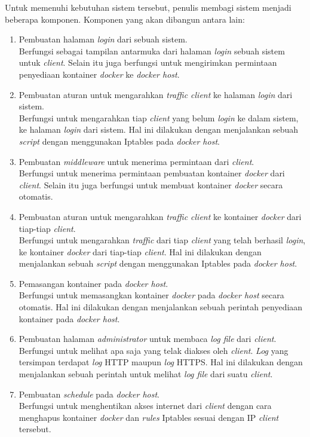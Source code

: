 \indent Untuk memenuhi kebutuhan sistem tersebut, penulis membagi sistem menjadi beberapa komponen. Komponen yang akan dibangun antara lain: 
\begin{enumerate} 
	\item Pembuatan halaman \textit{login} dari sebuah sistem.\\
	Berfungsi sebagai tampilan antarmuka dari halaman \textit{login} sebuah sistem untuk \textit{client}. Selain itu juga berfungsi untuk mengirimkan permintaan penyediaan kontainer \textit{docker} ke \textit{docker host}.
	\item Pembuatan aturan untuk mengarahkan \textit{traffic client} ke halaman \textit{login} dari sistem.\\
	Berfungsi untuk mengarahkan tiap \textit{client} yang belum \textit{login} ke dalam sistem, ke halaman \textit{login} dari sistem. Hal ini dilakukan dengan menjalankan sebuah \textit{script} dengan menggunakan Iptables pada \textit{docker host}.
	\item Pembuatan \textit{middleware} untuk menerima permintaan dari \textit{client}.\\
	Berfungsi untuk menerima permintaan pembuatan kontainer \textit{docker} dari \textit{client}. Selain itu juga berfungsi untuk membuat kontainer \textit{docker} secara otomatis.
	\item Pembuatan aturan untuk mengarahkan \textit{traffic client} ke kontainer \textit{docker} dari tiap-tiap \textit{client}.\\
	Berfungsi untuk mengarahkan \textit{traffic} dari tiap \textit{client} yang telah berhasil \textit{login}, ke kontainer \textit{docker} dari tiap-tiap \textit{client}. Hal ini dilakukan dengan menjalankan sebuah \textit{script} dengan menggunakan Iptables pada \textit{docker host}.
	\item Pemasangan kontainer pada \textit{docker host}.\\
	Berfungsi untuk memasangkan kontainer \textit{docker} pada \textit{docker host} secara otomatis. Hal ini dilakukan dengan menjalankan sebuah perintah penyediaan kontainer pada \textit{docker host}.
	\item Pembuatan halaman \textit{administrator} untuk membaca \textit{log file} dari \textit{client}.\\
	Berfungsi untuk melihat apa saja yang telak diakses oleh \textit{client}. \textit{Log} yang tersimpan terdapat \textit{log} HTTP maupun \textit{log} HTTPS.  Hal ini dilakukan dengan menjalankan sebuah perintah untuk melihat \textit{log file} dari suatu \textit{client}.
	\item Pembuatan \textit{schedule} pada \textit{docker host}.\\
	Berfungsi untuk menghentikan akses internet dari \textit{client} dengan cara menghapus kontainer \textit{docker} dan \textit{rules} Iptables sesuai dengan IP \textit{client} tersebut.
	
\end{enumerate}

